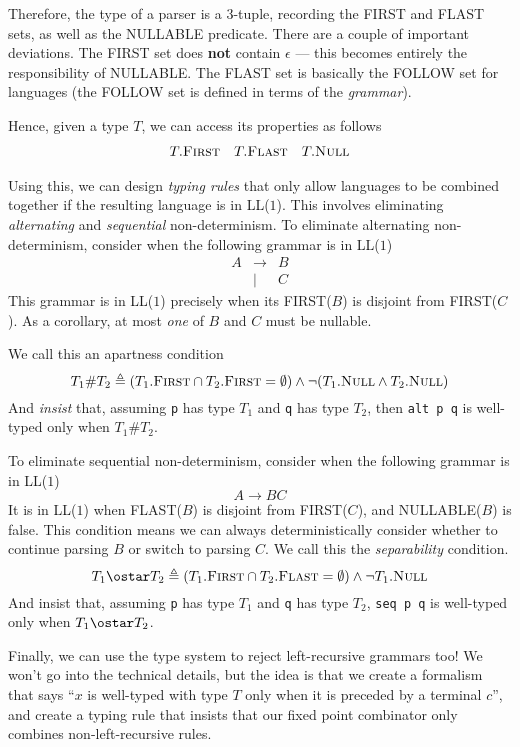 Therefore, the type of a parser is a 3-tuple, recording the \textsf{FIRST} and \textsf{FLAST} sets, as well as the \textsf{NULLABLE} predicate. There are a couple of important deviations. The \textsf{FIRST} set does \textbf{not} contain $\epsilon$ --- this becomes entirely the responsibility of \textsf{NULLABLE}. The \textsf{FLAST} set is basically the \textsf{FOLLOW} set for languages (the \textsf{FOLLOW} set is defined in terms of the \textit{grammar}).

Hence, given a type $T$, we can access its properties as follows
\[
\begin{array}{ccc}
     T.\textsc{First} & T.\textsc{Flast} & T.\textsc{Null}  \\ 
\end{array}
\]

Using this, we can design \textit{typing rules} that only allow languages to be combined together if the resulting language is in LL($1$). This involves eliminating \textit{alternating} and \textit{sequential} non-determinism. To eliminate alternating non-determinism, consider when the following grammar is in LL($1$)
\[\begin{array}{rcl}
     A&\to&B  \\
     &\mid&C  
\end{array}\]
This grammar is in LL($1$) precisely when its \textsf{FIRST}($B$) is disjoint from \textsf{FIRST}($C$). As a corollary, at most \textit{one} of $B$ and $C$ must be nullable. 

We call this an apartness condition
\[
T_1 \# T_2 \triangleq (T_1.\textsc{First} \cap T_2.\textsc{First} = \emptyset) \land \neg (T_1.\textsc{Null} \land T_2.\textsc{Null})
\]
And \textit{insist} that, assuming \texttt{p} has type $T_1$ and \texttt{q} has type $T_2$, then \texttt{alt p q} is well-typed only when $T_1 \# T_2$.

To eliminate sequential non-determinism, consider when the following grammar is in LL($1$)
\[A\to BC\]
It is in LL($1$) when \textsf{FLAST}($B$) is disjoint from \textsf{FIRST}($C$), and \textsf{NULLABLE}($B$) is false. This condition means we can always deterministically consider whether to continue parsing $B$ or switch to parsing $C$. We call this the \textit{separability} condition.
\[
T_1 \ostar T_2 \triangleq (T_1.\textsc{First} \cap T_2.\textsc{Flast} = \emptyset) \land \neg T_1.\textsc{Null}
\]
And insist that, assuming \texttt{p} has type $T_1$ and \texttt{q} has type $T_2$, \texttt{seq p q} is well-typed only when $T_1 \ostar T_2$.

Finally, we can use the type system to reject left-recursive grammars too! We won't go into the technical details, but the idea is that we create a formalism that says ``$x$ is well-typed with type $T$ only when it is preceded by a terminal $c$'', and create a typing rule that insists that our fixed point combinator only combines non-left-recursive rules.